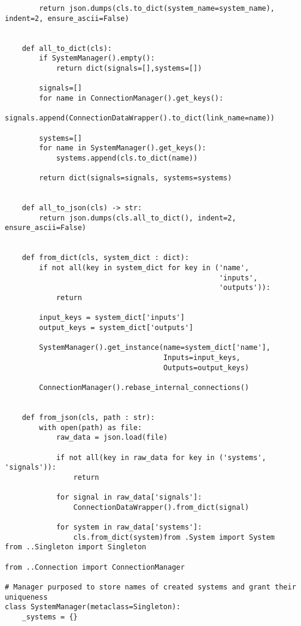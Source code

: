 \begin{verbatim}
        return json.dumps(cls.to_dict(system_name=system_name), indent=2, ensure_ascii=False)

    
    def all_to_dict(cls):
        if SystemManager().empty():
            return dict(signals=[],systems=[])
        
        signals=[]
        for name in ConnectionManager().get_keys():
            signals.append(ConnectionDataWrapper().to_dict(link_name=name))
        
        systems=[]
        for name in SystemManager().get_keys():
            systems.append(cls.to_dict(name))
        
        return dict(signals=signals, systems=systems)
    
    
    def all_to_json(cls) -> str:
        return json.dumps(cls.all_to_dict(), indent=2, ensure_ascii=False)
    
    
    def from_dict(cls, system_dict : dict):
        if not all(key in system_dict for key in ('name',
                                                  'inputs', 
                                                  'outputs')):
            return
        
        input_keys = system_dict['inputs']
        output_keys = system_dict['outputs']
        
        SystemManager().get_instance(name=system_dict['name'],
                                     Inputs=input_keys,
                                     Outputs=output_keys)
        
        ConnectionManager().rebase_internal_connections()
    
    
    def from_json(cls, path : str):
        with open(path) as file:
            raw_data = json.load(file)
            
            if not all(key in raw_data for key in ('systems', 'signals')):
                return
            
            for signal in raw_data['signals']:
                ConnectionDataWrapper().from_dict(signal)
            
            for system in raw_data['systems']:
                cls.from_dict(system)from .System import System
from ..Singleton import Singleton

from ..Connection import ConnectionManager

# Manager purposed to store names of created systems and grant their uniqueness
class SystemManager(metaclass=Singleton):
    _systems = {}


\end{verbatim}
